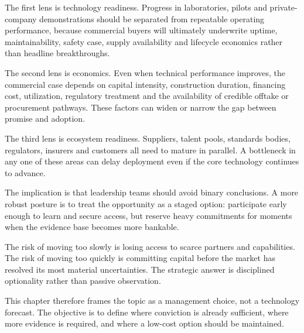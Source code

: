 \documentclass[10pt,a4paper]{article}
\begin{document}
{\small The first lens is technology readiness. Progress in laboratories, pilots and private-company demonstrations should be separated from repeatable operating performance, because commercial buyers will ultimately underwrite uptime, maintainability, safety case, supply availability and lifecycle economics rather than headline breakthroughs.}\par
{\small The second lens is economics. Even when technical performance improves, the commercial case depends on capital intensity, construction duration, financing cost, utilization, regulatory treatment and the availability of credible offtake or procurement pathways. These factors can widen or narrow the gap between promise and adoption.}\par
{\small The third lens is ecosystem readiness. Suppliers, talent pools, standards bodies, regulators, insurers and customers all need to mature in parallel. A bottleneck in any one of these areas can delay deployment even if the core technology continues to advance.}\par
{\small The implication is that leadership teams should avoid binary conclusions. A more robust posture is to treat the opportunity as a staged option: participate early enough to learn and secure access, but reserve heavy commitments for moments when the evidence base becomes more bankable.}\par
{\small The risk of moving too slowly is losing access to scarce partners and capabilities. The risk of moving too quickly is committing capital before the market has resolved its most material uncertainties. The strategic answer is disciplined optionality rather than passive observation.}\par
{\small This chapter therefore frames the topic as a management choice, not a technology forecast. The objective is to define where conviction is already sufficient, where more evidence is required, and where a low-cost option should be maintained.}\par
\label{chap:2:end}
\end{document}
